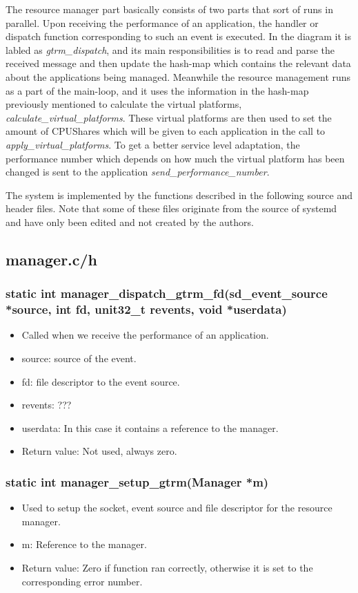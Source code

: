 \documentclass[nobiblatex]{LTHthesis}
\begin{document}
The resource manager part basically consists of two parts that sort of runs in parallel. Upon receiving the performance of an application, the handler or dispatch function corresponding to such an event is executed. In the diagram it is labled as \emph{gtrm\_dispatch}, and its main responsibilities is to read and parse the received message and then update the hash-map which contains the relevant data about the applications being managed. Meanwhile the resource management runs as a part of the main-loop, and it uses the information in the hash-map previously mentioned to calculate the virtual platforms, \emph{calculate\_virtual\_platforms}. These virtual platforms are then used to set the amount of CPUShares which will be given to each application in the call to \emph{apply\_virtual\_platforms}. To get a better service level adaptation, the performance number which depends on how much the virtual platform has been changed is sent to the application \emph{send\_performance\_number}.

The system is implemented by the functions described in the following source and header files. Note that some of these files originate from the source of systemd and have only been edited and not created by the authors.

\subsection{manager.c/h}
\subsubsection{static int manager\_dispatch\_gtrm\_fd(sd\_event\_source *source, int fd, unit32\_t revents, void *userdata)}
\begin{itemize}
\item Called when we receive the performance of an application.
\item source: source of the event.
\item fd: file descriptor to the event source.
\item revents: ???
\item userdata: In this case it contains a reference to the manager.
\item Return value: Not used, always zero.
\end{itemize}

\subsubsection{static int manager\_setup\_gtrm(Manager *m)}
\begin{itemize}
\item Used to setup the socket, event source and file descriptor for the resource manager.
\item m: Reference to the manager.
\item Return value: Zero if function ran correctly, otherwise it is set to the corresponding error number.
\end{itemize}
\end{document}
